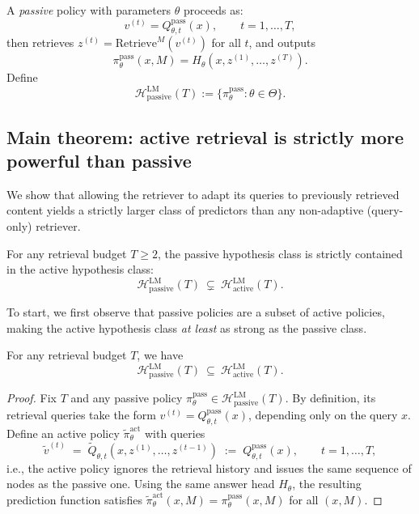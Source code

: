 \begin{definition}
A \emph{passive} policy with parameters \(\theta\) proceeds as:
\[
  v^{(t)} = Q^{\mathrm{pass}}_{\theta,t}(x), \qquad t=1,\dots,T,
\]
then retrieves \(z^{(t)} = \mathrm{Retrieve}^M(v^{(t)})\) for all \(t\), and outputs
\[
  \pi^{\mathrm{pass}}_\theta(x,M) = H_\theta(x, z^{(1)},\dots,z^{(T)}).
\]
Define
\[
  \mathcal{H}^{\mathrm{LM}}_{\mathrm{passive}}(T) := \{\pi^{\mathrm{pass}}_\theta : \theta\in\Theta\}.
\]
\end{definition}



\subsection{Main theorem: active retrieval is strictly more powerful than passive}

We show that allowing the retriever to adapt its queries to previously retrieved
content yields a strictly larger class of predictors than any non-adaptive (query-only) retriever.

\begin{theorem} For any retrieval budget \(T\ge 2\), the passive hypothesis class is strictly contained in the active hypothesis class: \[
\mathcal{H}^{\mathrm{LM}}_{\mathrm{passive}}(T)\ \subsetneq\ \mathcal{H}^{\mathrm{LM}}_{\mathrm{active}}(T). \] 
\label{thm:main}
\end{theorem}


To start, we first observe that passive policies are a subset of active policies, making the active hypothesis class \emph{at least} as strong as the passive class. 

\begin{lemma} \label{lem:power} For any retrieval budget \(T\), we have \[ \mathcal{H}^{\mathrm{LM}}_{\mathrm{passive}}(T)\ \subseteq\ \mathcal{H}^{\mathrm{LM}}_{\mathrm{active}}(T). \] \end{lemma} \begin{proof} Fix \(T\) and any passive policy \(\pi^{\mathrm{pass}}_\theta \in \mathcal{H}^{\mathrm{LM}}_{\mathrm{passive}}(T)\). By definition, its retrieval queries take the form \(v^{(t)} = Q^{\mathrm{pass}}_{\theta,t}(x)\), depending only on the query \(x\). Define an active policy \(\tilde \pi^{\mathrm{act}}_\theta\) with queries \[ \tilde v^{(t)} \;=\; \tilde Q_{\theta,t}(x,z^{(1)},\dots,z^{(t-1)}) \;:=\; Q^{\mathrm{pass}}_{\theta,t}(x), \qquad t=1,\dots,T, \] i.e., the active policy ignores the retrieval history and issues the same sequence of nodes as the passive one. Using the same answer head \(H_\theta\), the resulting prediction function satisfies \(\tilde \pi^{\mathrm{act}}_\theta(x,M)=\pi^{\mathrm{pass}}_\theta(x,M)\) for all \((x,M)\). 
\end{proof} 

